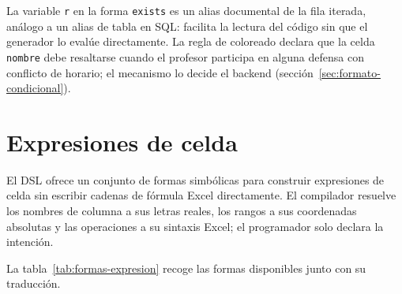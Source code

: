 \documentclass[12pt,a4paper]{report}
\begin{document}
La variable \texttt{r} en la forma \texttt{exists} es un alias documental
de la fila iterada, an\'alogo a un alias de tabla en SQL: facilita la
lectura del c\'odigo sin que el generador lo eval\'ue directamente.  La
regla de coloreado declara que la celda \texttt{nombre} debe resaltarse
cuando el profesor participa en alguna defensa con conflicto de horario; el
mecanismo lo decide el backend (secci\'on~\ref{sec:formato-condicional}).

\section{Expresiones de celda}
\label{sec:expresiones}

El DSL ofrece un conjunto de formas simb\'olicas para construir expresiones
de celda sin escribir cadenas de f\'ormula Excel directamente.  El
compilador resuelve los nombres de columna a sus letras reales, los rangos
a sus coordenadas absolutas y las operaciones a su sintaxis Excel; el
programador solo declara la intenci\'on.

La tabla~\ref{tab:formas-expresion} recoge las formas disponibles junto con
su traducci\'on.
\end{document}
